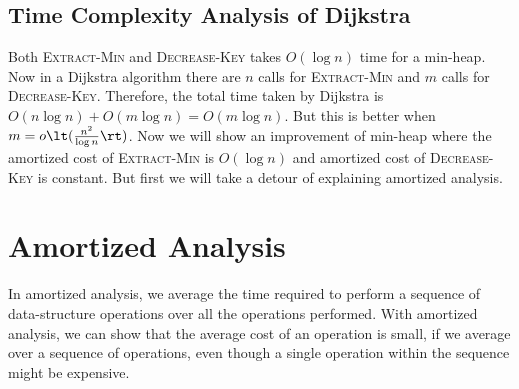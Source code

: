 \subsection{Time Complexity Analysis of Dijkstra}
Both \textsc{Extract-Min} and \textsc{Decrease-Key} takes $O(\log n)$ time for a min-heap. Now in a Dijkstra algorithm there are $n$ calls for \textsc{Extract-Min} and $m$ calls for \textsc{Decrease-Key}. Therefore, the total time taken by Dijkstra is $O(n\log n)+O(m\log n)=O(m\log n)$. But this is better when $m=o\lt(\frac{n^2}{\log n}\rt)$. Now we will show an improvement of min-heap where the amortized cost of \textsc{Extract-Min} is $O(\log n)$ and amortized cost of \textsc{Decrease-Key} is constant. But first we will take a detour of explaining amortized analysis.
\section{Amortized Analysis}
In amortized analysis, we average the time required to perform a sequence of data-structure operations over all the operations performed. With amortized analysis, we can show that the average cost of an operation is small, if we average over a sequence of operations, even though a single operation within the sequence might be expensive.

